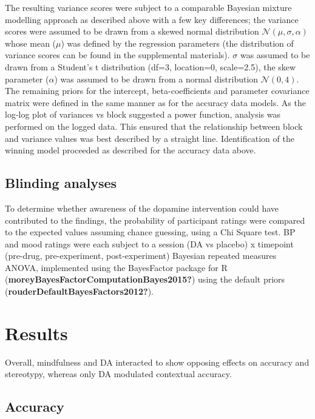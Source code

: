 \documentclass{article}
\begin{document}
The resulting variance scores were subject to a comparable Bayesian
mixture modelling approach as described above with a few key
differences; the variance scores were assumed to be drawn from a skewed
normal distribution \(\mathcal{N}(\mu, \sigma, \alpha)\) whose mean
(\(\mu\)) was defined by the regression parameters (the distribution of
variance scores can be found in the supplemental materials). \(\sigma\)
was assumed to be drawn from a Student's t distribution (df=3,
location=0, scale=2.5), the skew parameter (\(\alpha\)) was assumed to
be drawn from a normal distribution \(\mathcal{N}(0,4)\). The remaining
priors for the intercept, beta-coefficients and parameter covariance
matrix were defined in the same manner as for the accuracy data models.
As the log-log plot of variances vs block suggested a power function,
analysis was performed on the logged data. This ensured that the
relationship between block and variance values was best described by a
straight line. Identification of the winning model proceeded as
described for the accuracy data above.

\hypertarget{blinding-analyses}{%
\subsection{Blinding analyses}\label{blinding-analyses}}

To determine whether awareness of the dopamine intervention could have
contributed to the findings, the probability of participant ratings were
compared to the expected values assuming chance guessing, using a Chi
Square test. BP and mood ratings were each subject to a session (DA vs
placebo) x timepoint (pre-drug, pre-experiment, post-experiment)
Bayesian repeated measures ANOVA, implemented using the BayesFactor
package for R (\textbf{moreyBayesFactorComputationBayes2015?}) using the
default priors (\textbf{rouderDefaultBayesFactors2012?}).

\hypertarget{results}{%
\section{Results}\label{results}}

Overall, mindfulness and DA interacted to show opposing effects on
accuracy and stereotypy, whereas only DA modulated contextual accuracy.

\hypertarget{accuracy-1}{%
\subsection{Accuracy}\label{accuracy-1}}
\end{document}
